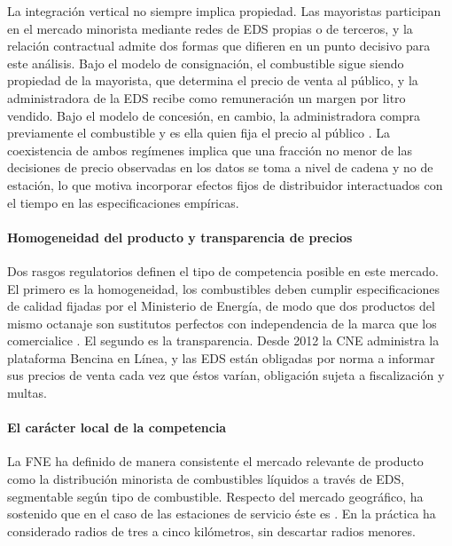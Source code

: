 La integración vertical no siempre implica propiedad. Las mayoristas participan en el mercado minorista mediante redes de EDS propias o de terceros, y la relación contractual admite dos formas que difieren en un punto decisivo para este análisis. Bajo el modelo de consignación, el combustible sigue siendo propiedad de la mayorista, que determina el precio de venta al público, y la administradora de la EDS recibe como remuneración un margen por litro vendido. Bajo el modelo de concesión, en cambio, la administradora compra previamente el combustible y es ella quien fija el precio al público \parencite{FNE2025informe}. La coexistencia de ambos regímenes implica que una fracción no menor de las decisiones de precio observadas en los datos se toma a nivel de cadena y no de estación, lo que motiva incorporar efectos fijos de distribuidor interactuados con el tiempo en las especificaciones empíricas.

\paragraph{Homogeneidad del producto y transparencia de precios} Dos rasgos regulatorios definen el tipo de competencia posible en este mercado. El primero es la homogeneidad, los combustibles deben cumplir especificaciones de calidad fijadas por el Ministerio de Energía, de modo que dos productos del mismo octanaje son sustitutos perfectos con independencia de la marca que los comercialice \parencite{FNE2025informe}. El segundo es la transparencia. Desde 2012 la CNE administra la plataforma Bencina en Línea, y las EDS están obligadas
por norma a informar sus precios de venta cada vez que éstos varían, obligación sujeta a fiscalización y multas.

\paragraph{El carácter local de la competencia} La FNE ha definido de manera consistente el mercado relevante de producto como la distribución minorista de combustibles líquidos a través de EDS, segmentable según tipo de combustible. Respecto del mercado geográfico, ha sostenido que en el caso de las estaciones de servicio éste es .
En la práctica ha considerado radios de tres a cinco kilómetros, sin descartar radios menores.

